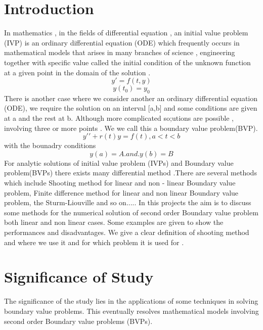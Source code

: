 \documentclass[12pt]{report}
\begin{document}
	\section{Introduction}
	In mathematics , in the fields of differential equation , an initial value problem (IVP) is an ordinary differential equation (ODE) which frequently occurs in mathematical models that arises in many branches of science , engineering together with specific value called the initial condition of the unknown function at a given point in the domain of the solution .
	\begin{equation}
		y\prime = f(t,y)
	\end{equation}
	\begin{equation}
		y(t_0) = y_0
	\end{equation}
	There is another case where we consider another an ordinary differential equation (ODE), we require the solution on an interval [a,b] and some conditions are given at a and the rest at b. Although more complicated so;utions are possible , involving three or more points . We we call this a boundary value problem(BVP).
	\begin{equation}
		y\prime\prime +r(t)y = f(t),	 a < t < b
	\end{equation}
	with the bounadry conditions 
	\begin{equation}
		y(a) = A    .   and    .  y(b) =B
	\end{equation}
	For analytic solutions of initial value problem (IVPs) and Boundary value problem(BVPs) there exists many differential method .There are several methods which include Shooting method for linear and non - linear Boundary value problem, Finite difference method for linear and non linear Boundary value problem, the Sturm-Liouville  and so on.....
	In this projects the aim is to discuss some methods for the numerical solution of second order Boundary value problem both linear and non linear cases.\newline
	Some examples are given to show the performances and disadvantages. We give a clear definition of shooting method and where we use it  and for which problem it is used for .
	
	\section{Significance of Study}
	The significance of the study lies in the applications of some techniques in solving boundary value problems. This eventually resolves mathematical models involving second order Boundary value problems (BVPs).
	
\end{document}
